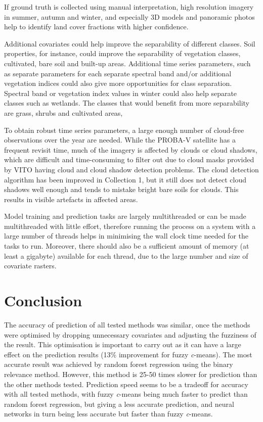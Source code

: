 \documentclass[a4paper,10pt]{book}
\begin{document}
If ground truth is collected using manual interpretation, high resolution imagery in summer, autumn and winter, and especially 3D models and panoramic photos help to identify land cover fractions with higher confidence.

Additional covariates could help improve the separability of different classes. Soil properties, for instance, could improve the separability of vegetation classes, cultivated, bare soil and built-up areas. Additional time series parameters, such as separate parameters for each separate spectral band and/or additional vegetation indices could also give more opportunities for class separation. Spectral band or vegetation index values in winter could also help separate classes such as wetlands. The classes that would benefit from more separability are grass, shrubs and cultivated areas, 

To obtain robust time series parameters, a large enough number of cloud-free observations over the year are needed. While the PROBA-V satellite has a frequent revisit time, much of the imagery is affected by clouds or cloud shadows, which are difficult and time-consuming to filter out due to cloud masks provided by VITO having cloud and cloud shadow detection problems. The cloud detection algorithm has been improved in Collection 1, but it still does not detect cloud shadows well enough and tends to mistake bright bare soils for clouds. This results in visible artefacts in affected areas.

Model training and prediction tasks are largely multithreaded or can be made multithreaded with little effort, therefore running the process on a system with a large number of threads helps in minimising the wall clock time needed for the tasks to run. Moreover, there should also be a sufficient amount of memory (at least a gigabyte) available for each thread, due to the large number and size of covariate rasters.

\chapter{Conclusion}

The accuracy of prediction of all tested methods was similar, once the methods were optimised by dropping unnecessary covariates and adjusting the fuzziness of the result. This optimisation is important to carry out as it can have a large effect on the prediction results (13\% improvement for fuzzy \textit{c}-means). The most accurate result was achieved by random forest regression using the binary relevance method. However, this method is 25-50 times slower for prediction than the other methods tested. Prediction speed seems to be a tradeoff for accuracy with all tested methods, with fuzzy \textit{c}-means being much faster to predict than random forest regression, but giving a less accurate prediction, and neural networks in turn being less accurate but faster than fuzzy \textit{c}-means.
\end{document}
